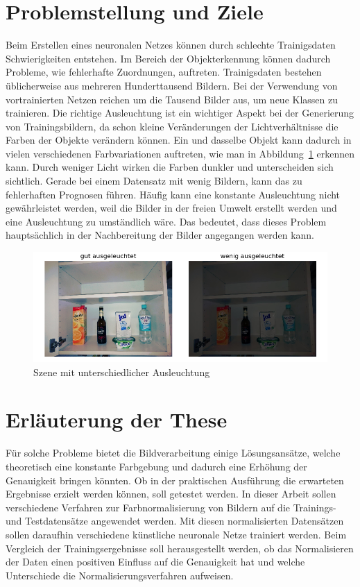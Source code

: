 \section{Problemstellung und Ziele}\label{s.probuziel} 
Beim Erstellen eines neuronalen Netzes können durch schlechte Trainigsdaten Schwierigkeiten entstehen. Im Bereich der Objekterkennung können dadurch Probleme, wie fehlerhafte Zuordnungen, auftreten. Trainigsdaten bestehen üblicherweise aus mehreren Hunderttausend Bildern. Bei der Verwendung von vortrainierten Netzen reichen um die Tausend Bilder aus, um neue Klassen zu trainieren. Die richtige Ausleuchtung ist ein wichtiger Aspekt bei der Generierung von Trainingsbildern, da schon kleine Veränderungen der Lichtverhältnisse die Farben der Objekte verändern können. Ein und dasselbe Objekt kann dadurch in vielen verschiedenen Farbvariationen auftreten, wie man in Abbildung~\ref{img:problem} erkennen kann. Durch weniger Licht wirken die Farben dunkler und unterscheiden sich sichtlich. Gerade bei einem Datensatz mit wenig Bildern, kann das zu fehlerhaften Prognosen führen. Häufig kann eine konstante Ausleuchtung nicht gewährleistet werden, weil die Bilder in der freien Umwelt erstellt werden und eine Ausleuchtung zu umständlich wäre. Das bedeutet, dass dieses Problem hauptsächlich in der Nachbereitung der Bilder angegangen werden kann.
\begin{figure}
	[h]
	\centering
	\includegraphics[scale=0.7]{Sources/Vergleich.png}
	\caption{Szene mit unterschiedlicher Ausleuchtung}
	\label{img:problem}
\end{figure}
\section{Erläuterung der These}\label{s.these}
Für solche Probleme bietet die Bildverarbeitung einige Lösungsansätze, welche theoretisch eine konstante Farbgebung und dadurch eine Erhöhung der Genauigkeit bringen könnten. Ob in der praktischen Ausführung die erwarteten Ergebnisse erzielt werden können, soll getestet werden. In dieser Arbeit sollen verschiedene Verfahren zur Farbnormalisierung von Bildern auf die Trainings- und Testdatensätze angewendet werden. Mit diesen normalisierten Datensätzen sollen daraufhin verschiedene künstliche neuronale Netze trainiert werden. Beim Vergleich der Trainingsergebnisse soll herausgestellt werden, ob das Normalisieren der Daten einen positiven Einfluss auf die Genauigkeit hat und welche Unterschiede die Normalisierungsverfahren aufweisen.
